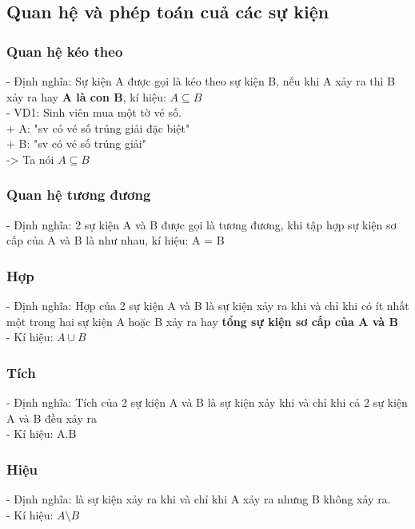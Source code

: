 \documentclass{article}
\begin{document}
\subsection{Quan hệ và phép toán cuả các sự kiện}

\subsubsection {Quan hệ kéo theo}
- Định nghĩa: Sự kiện A được gọi là kéo theo sự kiện B, nếu khi A xảy ra thì B xảy ra hay \textbf{A là con B}, kí hiệu: $A \subseteq B$ \\
- VD1: Sinh viên mua một tờ vé số. \\
    + A: "sv có vé số trúng giải đặc biệt" \\
    + B: "sv có vé số trúng giải" \\
    -> Ta nói $A \subseteq B$ \\
\subsubsection {Quan hệ tương đương}
- Định nghĩa: 2 sự kiện A và B được gọi là tương đương, khi tập hợp sự kiện sơ cấp của A và B là như nhau, kí hiệu: A = B\\

\subsubsection[short]{Hợp}
- Định nghĩa: Hợp của 2 sự kiện A và B là sự kiện xảy ra khi và chỉ khi có ít nhất một trong hai sự kiện A hoặc B xảy ra hay \textbf{tổng sự kiện sơ cấp của A và B}\\
- Kí hiệu: $A \cup B$\\

\subsubsection[short]{Tích}
- Định nghĩa: Tích của 2 sự kiện A và B là sự kiện xảy khi và chỉ khi cả 2 sự kiện A và B đều xảy ra\\
- Kí hiệu: A.B

\subsubsection{Hiệu}
- Định nghĩa: là sự kiện xảy ra khi và chỉ khi A xảy ra nhưng B không xảy ra.\\
- Kí hiệu: $A \setminus B$\\
\end{document}
